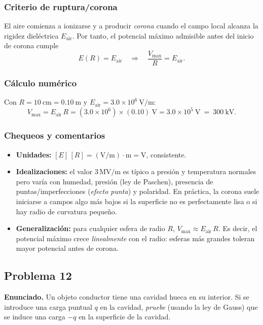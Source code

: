\documentclass{article}
\begin{document}
\subsubsection*{Criterio de ruptura/corona}
El aire comienza a ionizarse y a producir \emph{corona} cuando el campo local alcanza la rigidez dieléctrica $E_{\text{air}}$. Por tanto, el potencial máximo admisible antes del inicio de corona cumple
\[
E(R)=E_{\text{air}}\quad\Longrightarrow\quad \frac{V_{\max}}{R}=E_{\text{air}}.
\]

\subsubsection*{Cálculo numérico}
Con $R=10\ \text{cm}=0.10\ \text{m}$ y $E_{\text{air}}=3.0\times 10^{6}\ \text{V/m}$:
\[
\boxed{\,V_{\max}=E_{\text{air}}\,R=(3.0\times 10^{6})\times (0.10)\ \text{V}
= 3.0\times 10^{5}\ \text{V}\ =\ 300\ \text{kV}. \,}
\]

\subsubsection*{Chequeos y comentarios}
\begin{itemize}
\item \textbf{Unidades:} $[E]\,[R]=(\text{V/m})\cdot\text{m}=\text{V}$, consistente.
\item \textbf{Idealizaciones:} el valor $3\,\text{MV/m}$ es típico a presión y temperatura normales pero varía con humedad, presión (ley de Paschen), presencia de puntas/imperfecciones (\emph{efecto punta}) y polaridad. En práctica, la corona suele iniciarse a campos algo más bajos si la superficie no es perfectamente lisa o si hay radio de curvatura pequeño.
\item \textbf{Generalización:} para cualquier esfera de radio $R$, $V_{\max}\approx E_{\text{air}}\,R$. Es decir, el potencial máximo crece \emph{linealmente} con el radio: esferas más grandes toleran mayor potencial antes de corona.
\end{itemize}


\subsection{Problema 12} \vspace{0.5cm}

\textbf{Enunciado.} Un objeto conductor tiene una cavidad hueca en su interior. Si se introduce una carga puntual $q$ en la cavidad, \emph{pruebe} (usando la ley de Gauss) que se induce una carga $-q$ en la superficie de la cavidad.
\end{document}
